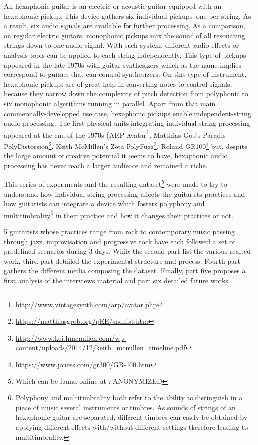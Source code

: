 \documentclass{article}
\begin{document}
An hexaphonic guitar is an electric or acoustic guitar equipped with an hexaphonic pickup. This device gathers six individual pickups, one per string. As a result, six audio signals are available for further processing. As a comparison, on regular electric guitars, monophonic pickups mix the sound of all resonating strings down to one audio signal. With such system, different audio effects or analysis tools can be applied to each string independently. This type of pickups appeared in the late 1970s with guitar synthesizers which as the name implies correspond to guitars that can control synthesizers. On this type of instrument, hexaphonic pickups are of great help in converting notes to control signals, because they narrow down the complexity of pitch detection from polyphonic to six monophonic algorithms running in parallel. Apart from that main commercially-developped use case, hexaphonic pickups enable independent-string audio processing. The first physical units integrating individual string processing appeared at the end of the 1970s (ARP Avatar\footnote{\url{http://www.vintagesynth.com/arp/avatar.php}}, Matthias Gob's Paradis PolyDistorsion\footnote{\url{https://matthiasgrob.org/pEE/sndhist.htm}}, Keith McMillen's Zeta PolyFuzz\footnote{\url{http://www.keithmcmillen.com/wp-content/uploads/2014/12/keith_mcmillen_timeline.pdf}}, Roland GR100\footnote{\url{https://www.joness.com/gr300/GR-100.htm}} but, despite the large amount of creative potential it seems to have, hexaphonic audio processing has never reach a larger audience and remained a niche. 

This series of experiments and the resulting dataset\footnote{Which can be found online at : ANONYMIZED} were made to try to understand how individual string processing affects the guitarists practices and how guitarists can integrate a device which fosters polyphony and multitimbrality\footnote{Polyphony and multitimbrality both refer to the ability to distinguish in a piece of music several instruments or timbres. As sounds of strings of an hexaphonic guitar are separated, different timbres can easily be obtained by applying different effects with/without different settings therefore leading to multitimbrality.} in their practice and how it changes their practices or not. 

5 guitarists whose practices range from rock to contemporary music passing through jazz, improvisation and progressive rock have each followed a set of predefined scenarios during 3 days. 
While the second part list the various realted work, third part detailed the experimental structure and process. Fourth part gathers the different media composing the dataset. Finally, part five proposes a first analysis of the interviews material and part six detailed future works. 
\end{document}
